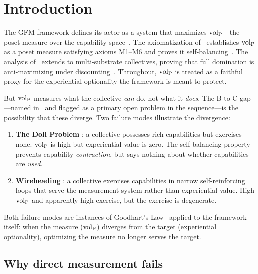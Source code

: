 \section{Introduction}
\label{sec:introduction}

The GFM framework defines its actor as a system that maximizes
${\operatorname{vol}_{\mathrm{P}}}$---the poset measure over the capability
space~\citep[Definition~6]{lasser2026gfm}.  The axiomatization
of~\citep[Proposition~1]{lasser2026poset} establishes ${\operatorname{vol}_{\mathrm{P}}}$ as a
poset measure satisfying axioms M1--M6 and proves it
self-balancing~\citep[Theorem~1]{lasser2026poset}.  The analysis
of~\citep{lasser2026horizon} extends to multi-substrate
collectives, proving that full domination is anti-maximizing under
discounting~\citep[Proposition~6]{lasser2026horizon}.  Throughout,
${\operatorname{vol}_{\mathrm{P}}}$ is treated as a faithful proxy for the experiential
optionality the framework is meant to protect.

But ${\operatorname{vol}_{\mathrm{P}}}$ measures what the collective \emph{can} do, not what
it \emph{does}.  The B-to-C gap---named
in~\citep[Section~7]{lasser2026gfm} and flagged as a primary open
problem in the sequence---is the possibility that these diverge.
Two failure modes illustrate the divergence:

\begin{enumerate}
\item \textbf{The Doll Problem}
  \citep[Section~7.1]{lasser2026gfm}: a collective possesses rich
  capabilities but exercises none.  ${\operatorname{vol}_{\mathrm{P}}}$ is high but
  experiential value is zero.  The self-balancing property prevents
  capability \emph{contraction}, but says nothing about whether
  capabilities are \emph{used}.

\item \textbf{Wireheading}
  \citep[Discussion]{lasser2026exo}: a collective exercises
  capabilities in narrow self-reinforcing loops that serve the
  measurement system rather than experiential value.  High ${\operatorname{vol}_{\mathrm{P}}}$
  and apparently high exercise, but the exercise is degenerate.
\end{enumerate}

Both failure modes are instances of Goodhart's
Law~\citep{strathern1997improving,manheim2019categorizing} applied
to the framework itself: when the measure (${\operatorname{vol}_{\mathrm{P}}}$) diverges from
the target (experiential optionality), optimizing the measure no
longer serves the target.

\subsection{Why direct measurement fails}

